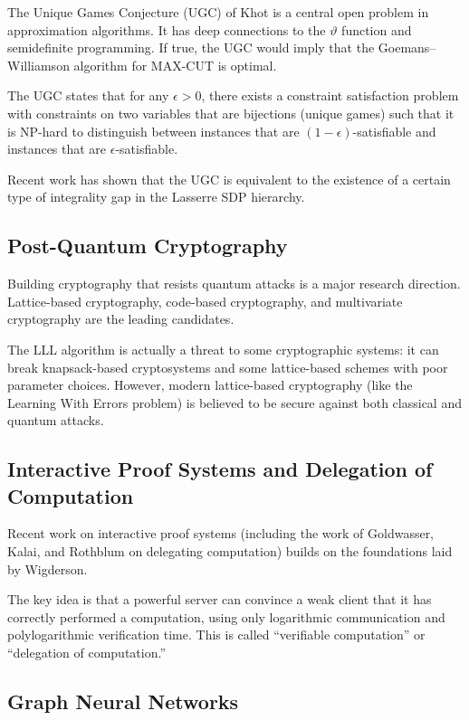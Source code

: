 The Unique Games Conjecture (UGC) of Khot is a central open problem in approximation algorithms. It has deep connections to the $\vartheta$ function and semidefinite programming. If true, the UGC would imply that the Goemans--Williamson algorithm for MAX-CUT is optimal.

The UGC states that for any $\epsilon > 0$, there exists a constraint satisfaction problem with constraints on two variables that are bijections (unique games) such that it is NP-hard to distinguish between instances that are $(1-\epsilon)$-satisfiable and instances that are $\epsilon$-satisfiable.

Recent work has shown that the UGC is equivalent to the existence of a certain type of integrality gap in the Lasserre SDP hierarchy.

\subsection{Post-Quantum Cryptography}

Building cryptography that resists quantum attacks is a major research direction. Lattice-based cryptography, code-based cryptography, and multivariate cryptography are the leading candidates.

The LLL algorithm is actually a threat to some cryptographic systems: it can break knapsack-based cryptosystems and some lattice-based schemes with poor parameter choices. However, modern lattice-based cryptography (like the Learning With Errors problem) is believed to be secure against both classical and quantum attacks.

\subsection{Interactive Proof Systems and Delegation of Computation}

Recent work on interactive proof systems (including the work of Goldwasser, Kalai, and Rothblum on delegating computation) builds on the foundations laid by Wigderson.

The key idea is that a powerful server can convince a weak client that it has correctly performed a computation, using only logarithmic communication and polylogarithmic verification time. This is called ``verifiable computation'' or ``delegation of computation.''

\subsection{Graph Neural Networks}

